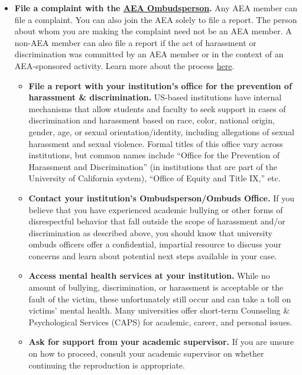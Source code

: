 \documentclass[
]{book}
\providecommand{\tightlist}{%
  \setlength{\itemsep}{0pt}\setlength{\parskip}{0pt}}
\begin{document}
\begin{itemize}
\tightlist
\item
  \textbf{File a complaint with the \href{https://www.aeaweb.org/about-aea/aea-ombudsperson}{AEA Ombudsperson}.} Any AEA member can file a complaint. You can also join the AEA solely to file a report. The person about whom you are making the complaint need not be an AEA member. A non-AEA member can also file a report if the act of harassment or discrimination was committed by an AEA member or in the context of an AEA-sponsored activity. Learn more about the process \href{https://www.aeaweb.org/about-aea/aea-ombudsperson/faq}{here}.

  \begin{itemize}
  \tightlist
  \item
    \textbf{File a report with your institution's office for the prevention of harassment \& discrimination.} US-based institutions have internal mechanisms that allow students and faculty to seek support in cases of discrimination and harassment based on race, color, national origin, gender, age, or sexual orientation/identity, including allegations of sexual harassment and sexual violence. Formal titles of this office vary across institutions, but common names include ``Office for the Prevention of Harassment and Discrimination'' (in institutions that are part of the University of California system), ``Office of Equity and Title IX,'' etc.
  \item
    \textbf{Contact your institution's Ombudsperson/Ombuds Office.} If you believe that you have experienced academic bullying or other forms of disrespectful behavior that fall outside the scope of harassment and/or discrimination as described above, you should know that university ombuds officers offer a confidential, impartial resource to discuss your concerns and learn about potential next steps available in your case.
  \item
    \textbf{Access mental health services at your institution.} While no amount of bullying, discrimination, or harassment is acceptable or the fault of the victim, these unfortunately still occur and can take a toll on victims' mental health. Many universities offer short-term Counseling \& Psychological Services (CAPS) for academic, career, and personal issues.
  \item
    \textbf{Ask for support from your academic supervisor.} If you are unsure on how to proceed, consult your academic supervisor on whether continuing the reproduction is appropriate.
  \end{itemize}
\end{itemize}
\end{document}
